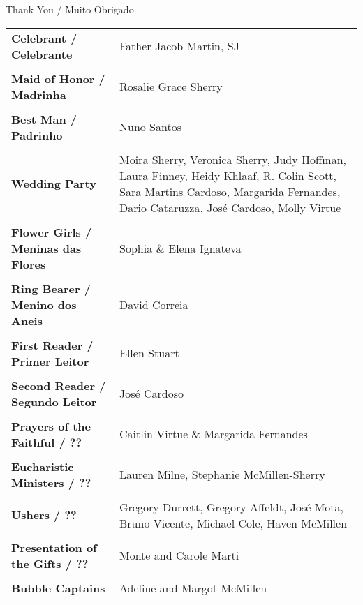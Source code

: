\centering
{\Large Thank You / Muito Obrigado}

\vspace{10pt}

\small

\begin{longtable}{p{2in}p{2in}}
{\bf Celebrant / Celebrante} & Father Jacob Martin, SJ\\
\\

{\bf Maid of Honor / Madrinha} & Rosalie Grace Sherry\\
\\

{\bf Best Man / Padrinho} & Nuno Santos\\
\\

{\bf Wedding Party} & Moira Sherry, Veronica Sherry, Judy Hoffman, Laura Finney, Heidy Khlaaf, R. Colin Scott, Sara Martins Cardoso, Margarida Fernandes, Dario Cataruzza, José Cardoso, Molly Virtue\\
\\

{\bf Flower Girls / Meninas das Flores} & Sophia \& Elena Ignateva\\
\\

{\bf Ring Bearer / Menino dos Aneis} & David Correia\\
\\

{\bf First Reader / Primer Leitor} & Ellen Stuart\\
\\

{\bf Second Reader / Segundo Leitor} & José Cardoso \\
\\

{\bf Prayers of the Faithful / ??} & Caitlin Virtue \& Margarida Fernandes \\
\\

{\bf Eucharistic Ministers / ??} & Lauren Milne, Stephanie McMillen-Sherry\\
\\

{\bf Ushers / ??} & Gregory Durrett, Gregory Affeldt, José Mota, Bruno Vicente, Michael Cole, Haven McMillen\\
\\

{\bf Presentation of the Gifts / ??} & Monte and Carole Marti\\
\\

{\bf Bubble Captains} & Adeline and Margot McMillen\\

\end{longtable}
